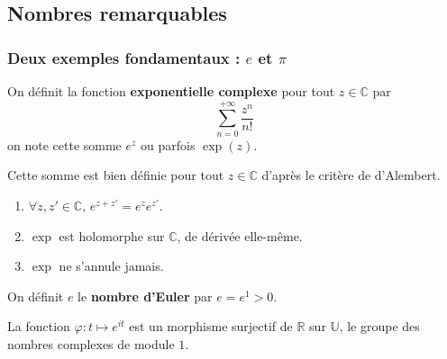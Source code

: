



  \subsection{Nombres remarquables}

  \subsubsection{Deux exemples fondamentaux : \texorpdfstring{$e$}{e} et \texorpdfstring{$\pi$}{π}}


  \begin{definition}
    On définit la fonction \textbf{exponentielle complexe} pour tout $z \in \mathbb{C}$ par
    \[ \sum_{n=0}^{+\infty} \frac{z^n}{n!} \]
    on note cette somme $e^z$ ou parfois $\exp(z)$.
  \end{definition}

  \begin{remark}
    Cette somme est bien définie pour tout $z \in \mathbb{C}$ d'après le critère de d'Alembert.
  \end{remark}

  \begin{proposition}
    \begin{enumerate}[label=(\roman*)]
      \item $\forall z, z' \in \mathbb{C}, \, e^{z+z'} = e^z e^{z'}$.
      \item $\exp$ est holomorphe sur $\mathbb{C}$, de dérivée elle-même.
      \item $\exp$ ne s'annule jamais.
    \end{enumerate}
  \end{proposition}


  \begin{definition}
    On définit $e$ le \textbf{nombre d'Euler} par $e = e^1 > 0$.
  \end{definition}


  \begin{proposition}
    La fonction $\varphi : t \mapsto e^{it}$ est un morphisme surjectif de $\mathbb{R}$ sur $\mathbb{U}$, le groupe des nombres complexes de module $1$.
  \end{proposition}

